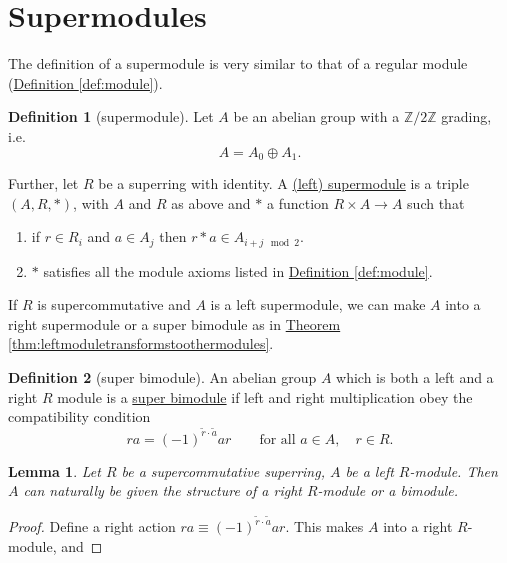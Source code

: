 \documentclass[a4paper]{report}
\newcommand{\Z}{\mathbb{Z}}
\newcommand{\defn}[1]{\ul{#1}}
\theoremstyle{definition}
\newtheorem{definition}{Definition}[section]
\theoremstyle{plain}
\newtheorem{lemma}{Lemma}[section]
\theoremstyle{remark}
\begin{document}
\section{Supermodules}
The definition of a supermodule is very similar to that of a regular module (\hyperref[def:module]{Definition \ref*{def:module}}).
\begin{definition}[supermodule]
  \label{def:supermodule}
  Let $A$ be an abelian group with a $\Z/2\Z$ grading, i.e.
  \begin{equation*}
    A = A_{0}\oplus A_{1}.
  \end{equation*}

  Further, let $R$ be a superring with identity. A \defn{(left) supermodule} is a triple $(A,R,* )$, with $A$ and $R$ as above and $*$ a function $R \times A \to A$ such that
  \begin{enumerate}
    \item if $r \in R_{i}$ and $a \in A_{j}$ then $r*a \in A_{i+j \mod{2}}$.
    \item $*$ satisfies all the module axioms listed in \hyperref[def:module]{Definition \ref*{def:module}}.
  \end{enumerate}
\end{definition}

If $R$ is supercommutative and $A$ is a left supermodule, we can make $A$ into a right supermodule or a super bimodule as in \hyperref[thm:leftmoduletransformstoothermodules]{Theorem \ref*{thm:leftmoduletransformstoothermodules}}.

\begin{definition}[super bimodule]
  \label{def:superbimodule}
  An abelian group $A$ which is both a left and a right $R$ module is a \defn{super bimodule} if left and right multiplication obey the compatibility condition
  \begin{equation*}
    ra = (-1)^{\tilde{r}\cdot \tilde{a}} ar\qquad \text{for all }a\in A,\quad r \in R.
  \end{equation*}
\end{definition}

\begin{lemma}
  Let $R$ be a supercommutative superring, $A$ be a left $R$-module. Then $A$ can naturally be given the structure of a right $R$-module or a bimodule.
\end{lemma}
\begin{proof}
  Define a right action $ra \equiv (-1)^{\tilde{r}\cdot \tilde{a}} ar$. This makes $A$ into a right $R$-module, and 
\end{proof}
\end{document}
